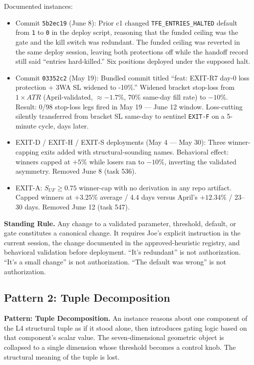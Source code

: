 \documentclass[11pt, a4paper]{article}
\newcommand{\rulebox}[1]{%
  \begin{framed}\noindent\textbf{Standing Rule.} #1\end{framed}}
\newcommand{\patternbox}[2]{%
  \begin{framed}\noindent\textbf{Pattern: #1.} #2\end{framed}}
\theoremstyle{definition}
\begin{document}
Documented instances:

\begin{itemize}
\item Commit \texttt{5b2ec19} (June 8): Prior c1 changed
\texttt{TFE\_ENTRIES\_HALTED} default from \texttt{1} to \texttt{0} in the
deploy script, reasoning that the funded ceiling was the gate and the kill
switch was redundant. The funded ceiling was reverted in the same deploy
session, leaving both protections off while the handoff record still said
``entries hard-killed.'' Six positions deployed under the supposed halt.

\item Commit \texttt{03352c2} (May 19): Bundled commit titled ``feat: EXIT-R7
day-0 loss protection + 3WA SL widened to -10\%.'' Widened bracket stop-loss
from $1\!\times\!ATR$ (April-validated, $\approx -1.7\%$, 70\% same-day fill
rate) to $-10\%$. Result: 0/98 stop-loss legs fired in May 19 --- June 12
window. Loss-cutting silently transferred from bracket SL same-day to
sentinel \texttt{EXIT-F} on a 5-minute cycle, days later.

\item EXIT-D / EXIT-H / EXIT-S deployments (May 4 --- May 30): Three
winner-capping exits added with structural-sounding names. Behavioral effect:
winners capped at $+5\%$ while losers ran to $-10\%$, inverting the validated
asymmetry. Removed June 8 (task 536).

\item EXIT-A: $S_{UF} \geq 0.75$ winner-cap with no derivation in any repo
artifact. Capped winners at $+3.25\%$ average / 4.4 days versus April's
$+12.34\%$ / 23--30 days. Removed June 12 (task 547).
\end{itemize}

\rulebox{Any change to a validated parameter, threshold, default, or gate
constitutes a canonical change. It requires Joe's explicit instruction in the
current session, the change documented in the approved-heuristic registry,
and behavioral validation before deployment. ``It's redundant'' is not
authorization. ``It's a small change'' is not authorization. ``The default
was wrong'' is not authorization.}

\subsection{Pattern 2: Tuple Decomposition}

\patternbox{Tuple Decomposition}{An instance reasons about one component of
the L4 structural tuple as if it stood alone, then introduces gating logic
based on that component's scalar value. The seven-dimensional geometric
object is collapsed to a single dimension whose threshold becomes a control
knob. The structural meaning of the tuple is lost.}
\end{document}
